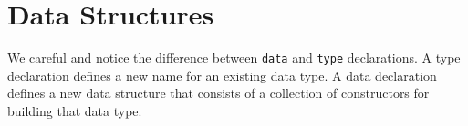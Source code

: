 
\chapter{Data Structures}


We careful and notice the difference between \lstinline{data} and \lstinline{type} declarations.
A type declaration defines a new name for an existing data type.
A data declaration defines a new data structure that consists of a collection of constructors for building that data type.
